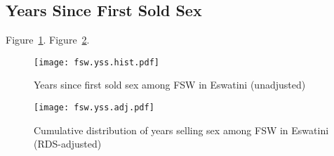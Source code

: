 \subsection{Years Since First Sold Sex}\label{app.model.res.fsw.dur}
Figure~\ref{fig:fsw.yss.raw}.
Figure~\ref{fig:fsw.yss.adj}.
\begin{figure}
  \texttt{[image: fsw.yss.hist.pdf]}
  \caption{Years since first sold sex among FSW in Eswatini (unadjusted)}
  \label{fig:fsw.yss.raw}
\end{figure}
\begin{figure}
  \centering
  \texttt{[image: fsw.yss.adj.pdf]}
  \caption{Cumulative distribution of years selling sex among FSW in Eswatini (RDS-adjusted)}
  \label{fig:fsw.yss.adj}
\end{figure}
\clearpage
